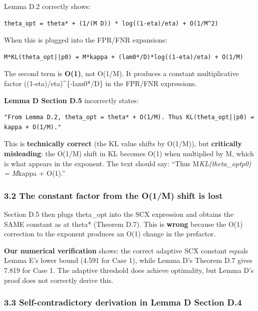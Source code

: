 \documentclass[
  12pt,
]{article}
\begin{document}
Lemma D.2 correctly shows:

\begin{verbatim}
theta_opt = theta* + (1/(M D)) * log((1-eta)/eta) + O(1/M^2)
\end{verbatim}

When this is plugged into the FPR/FNR expansions:

\begin{verbatim}
M*KL(theta_opt||p0) = M*kappa + (lam0*/D)*log((1-eta)/eta) + O(1/M)
\end{verbatim}

The second term is \textbf{O(1)}, not O(1/M). It produces a constant
multiplicative factor ((1-eta)/eta)\^{}\{-lam0*/D\} in the FPR/FNR
expressions.

\textbf{Lemma D Section D.5} incorrectly states:

\begin{verbatim}
"From Lemma D.2, theta_opt = theta* + O(1/M). Thus KL(theta_opt||p0) = kappa + O(1/M)."
\end{verbatim}

This is \textbf{technically correct} (the KL value shifts by O(1/M)),
but \textbf{critically misleading}: the O(1/M) shift in KL becomes O(1)
when multiplied by M, which is what appears in the exponent. The text
should say: ``Thus M\emph{KL(theta\_opt\textbar\textbar p0) = M}kappa +
O(1).''

\subsubsection{3.2 The constant factor from the O(1/M) shift is
lost}\label{the-constant-factor-from-the-o1m-shift-is-lost}

Section D.5 then plugs theta\_opt into the SCX expression and obtains
the SAME constant as at theta* (Theorem D.7). This is \textbf{wrong}
because the O(1) correction to the exponent produces an O(1) change in
the prefactor.

\textbf{Our numerical verification} shows: the correct adaptive SCX
constant equals Lemma E's lower bound (4.591 for Case 1), while Lemma
D's Theorem D.7 gives 7.819 for Case 1. The adaptive threshold does
achieve optimality, but Lemma D's proof does not correctly derive this.

\subsubsection{3.3 Self-contradictory derivation in Lemma D Section
D.4}\label{self-contradictory-derivation-in-lemma-d-section-d.4}
\end{document}
